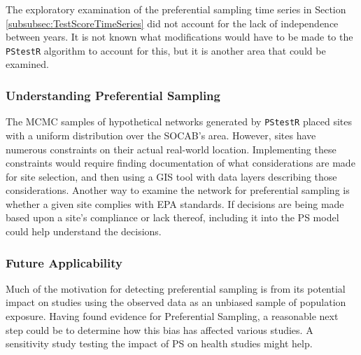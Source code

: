 The exploratory examination of the preferential sampling time series in Section \ref{subsubsec:TestScoreTimeSeries} did not account for the lack of independence between years.  It is not known what modifications would have to be made to the \texttt{PStestR} algorithm to account for this, but it is another area that could be examined.

\subsubsection*{Understanding Preferential Sampling}
\label{subsubsec:understandingPF}

The MCMC samples of hypothetical networks generated by \texttt{PStestR} placed sites with a uniform distribution over the SOCAB's area.  However, sites have numerous constraints on their actual real-world location.  Implementing these constraints would require finding documentation of what considerations are made for site selection, and then using a GIS tool with data layers describing those considerations.  Another way to examine the network for preferential sampling is whether a given site complies with \ac{EPA} standards.  If decisions are being made based upon a site's compliance or lack thereof, including it into the \ac{PS} model could help understand the decisions.

\subsubsection*{Future Applicability}
\label{subsubsec:futureapps}
Much of the motivation for detecting preferential sampling is from its potential impact on studies using the observed data as an unbiased sample of population exposure.  Having found evidence for Preferential Sampling, a reasonable next step could be to determine how this bias has affected various studies.  A sensitivity study testing the impact of \ac{PS} on health studies might help.
